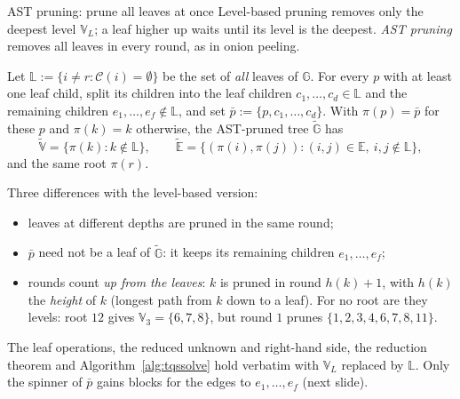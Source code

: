 \documentclass[aspectratio=169,11pt]{beamer}
\begin{document}
\begin{frame}{AST pruning: prune all leaves at once}
\footnotesize
Level-based pruning removes only the deepest level $\mathbb{V}_L$; a leaf higher up waits until its level is the deepest.
\emph{AST pruning} removes all leaves in every round, as in onion peeling.

\begin{definition}
\upshape
Let $\mathbb{L}:=\{i\neq r:\mathcal{C}(i)=\emptyset\}$ be the set of \emph{all} leaves of $\mathbb{G}$. For every $p$ with
at least one leaf child, split its children into the leaf children $c_1,\dots,c_d\in\mathbb{L}$ and the remaining children
$e_1,\dots,e_f\notin\mathbb{L}$, and set $\bar{p}:=\{p,c_1,\dots,c_d\}$. With $\pi(p)=\bar{p}$ for these $p$ and
$\pi(k)=k$ otherwise, the AST-pruned tree $\tilde{\mathbb{G}}$ has
\[
\tilde{\mathbb{V}}=\{\pi(k):k\notin\mathbb{L}\},\qquad
\tilde{\mathbb{E}}=\{(\pi(i),\pi(j)) : (i,j)\in\mathbb{E},\ i,j\notin\mathbb{L}\},
\]
and the same root $\pi(r)$.
\end{definition}

Three differences with the level-based version:
\begin{itemize}\setlength{\itemsep}{0pt}
\item leaves at different depths are pruned in the same round;
\item $\bar{p}$ need not be a leaf of $\tilde{\mathbb{G}}$: it keeps its remaining children $e_1,\dots,e_f$;
\item rounds count \emph{up from the leaves}: $k$ is pruned in round $h(k)+1$, with $h(k)$ the \emph{height} of $k$
  (longest path from $k$ down to a leaf). For no root are they levels: root $12$ gives $\mathbb{V}_3=\{6,7,8\}$, but
  round $1$ prunes $\{1,2,3,4,6,7,8,11\}$.
\end{itemize}
The leaf operations, the reduced unknown and right-hand side, the reduction theorem and
Algorithm~\ref{alg:tqssolve} hold verbatim with $\mathbb{V}_L$ replaced by $\mathbb{L}$. Only the spinner of $\bar{p}$
gains blocks for the edges to $e_1,\dots,e_f$ (next slide).
\end{frame}
\end{document}
